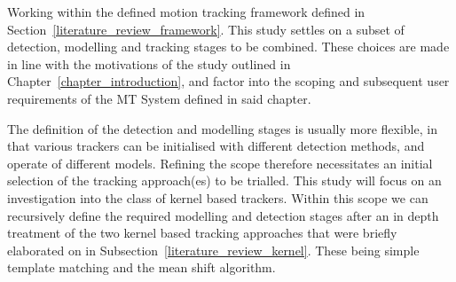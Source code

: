 Working within the defined motion tracking framework defined in
Section~\ref{literature_review_framework}. This study settles on a subset of
detection, modelling and tracking stages to be combined. These choices are made
in line with the motivations of the study outlined in
Chapter~\ref{chapter_introduction}, and factor into the scoping and subsequent user
requirements of the MT System defined in said chapter.

The definition of the detection and modelling stages is usually more flexible,
in that various trackers can be initialised with different detection methods,
and operate of different models. Refining the scope therefore necessitates an initial
selection of the tracking approach(es) to be trialled. 
This study will focus on an investigation into the class of kernel based
trackers. Within this scope we can recursively define the required modelling and
detection stages after an in depth treatment of the two kernel based tracking
approaches that were briefly elaborated on in
Subsection~\ref{literature_review_kernel}. These being simple template matching
and the mean shift algorithm. 

